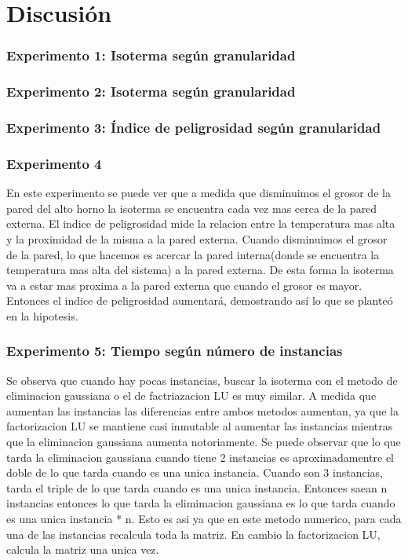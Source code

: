 \section{Discusión}

\subsubsection*{Experimento 1: Isoterma según granularidad}

\subsubsection*{Experimento 2: Isoterma según granularidad}

\subsubsection*{Experimento 3: Índice de peligrosidad según granularidad}




\subsubsection*{Experimento 4}
	En este experimento se puede ver que a medida que disminuimos el grosor de la pared del alto horno la isoterma se encuentra cada vez mas cerca de la pared externa. El indice de peligrosidad mide la relacion entre la temperatura mas alta y la proximidad de la misma a la pared externa. Cuando disminuimos el grosor de la pared, lo que hacemos es acercar la pared interna(donde se encuentra la temperatura mas alta del sistema) a la pared externa. De esta forma la isoterma va a estar mas proxima a la pared externa que cuando el grosor es mayor. Entonces el indice de peligrosidad aumentará, demostrando así lo que se planteó en la hipotesis.
	

\subsubsection*{Experimento 5: Tiempo según número de instancias}
	Se observa que cuando hay pocas instancias, buscar la isoterma con el metodo de eliminacion gaussiana o el de factriazacion LU es muy similar. A medida que aumentan las instancias las diferencias entre ambos metodos aumentan, ya que la factorizacion LU se mantiene casi inmutable al aumentar las instancias mientras que la eliminacion gaussiana aumenta notoriamente. Se puede observar que lo que tarda la eliminacion gaussiana cuando tiene 2 instancias es aproximadamentre el doble de lo que tarda cuando es una unica instancia. Cuando son 3 instancias, tarda el triple de lo que tarda cuando es una unica instancia. Entonces saean n instancias entonces lo que tarda la elimimacion gaussiana es lo que tarda cuando es una unica instancia * n. Esto es asi ya que en este metodo numerico, para cada una de las instancias recalcula toda la matriz. En cambio la factorizacion LU, calcula la matriz una unica vez.




